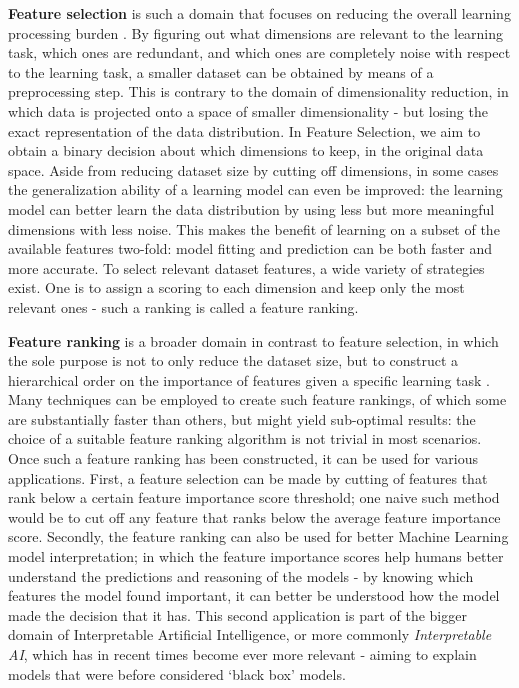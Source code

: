 \documentclass[../main.tex]{subfiles}
\begin{document}
\textbf{Feature selection} is such a domain that focuses on reducing the overall learning processing burden \citep{guyon_introduction_2003}. By figuring out what dimensions are relevant to the learning task, which ones are redundant, and which ones are completely noise with respect to the learning task, a smaller dataset can be obtained by means of a preprocessing step. This is contrary to the domain of dimensionality reduction, in which data is projected onto a space of smaller dimensionality - but losing the exact representation of the data distribution. In Feature Selection, we aim to obtain a binary decision about which dimensions to keep, in the original data space. Aside from reducing dataset size by cutting off dimensions, in some cases the generalization ability of a learning model can even be improved: the learning model can better learn the data distribution by using less but more meaningful dimensions with less noise. This makes the benefit of learning on a subset of the available features two-fold: model fitting and prediction can be both faster and more accurate. To select relevant dataset features, a wide variety of strategies exist. One is to assign a scoring to each dimension and keep only the most relevant ones - such a ranking is called a feature ranking.



\textbf{Feature ranking} is a broader domain in contrast to feature selection, in which the sole purpose is not to only reduce the dataset size, but to construct a hierarchical order on the importance of features given a specific learning task \citep{duch_comparison_2004}. Many techniques can be employed to create such feature rankings, of which some are substantially faster than others, but might yield sub-optimal results: the choice of a suitable feature ranking algorithm is not trivial in most scenarios. Once such a feature ranking has been constructed, it can be used for various applications. First, a feature selection can be made by cutting of features that rank below a certain feature importance score threshold; one naive such method would be to cut off any feature that ranks below the average feature importance score. Secondly, the feature ranking can also be used for better Machine Learning model interpretation; in which the feature importance scores help humans better understand the predictions and reasoning of the models - by knowing which features the model found important, it can better be understood how the model made the decision that it has. This second application is part of the bigger domain of Interpretable Artificial Intelligence, or more commonly \textit{Interpretable AI}, which has in recent times become ever more relevant \citep{ghosh_interpretable_2020} - aiming to explain models that were before considered `black box' models.
\end{document}
